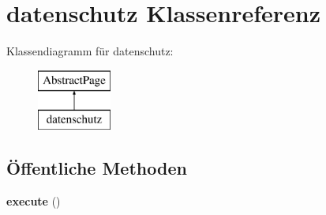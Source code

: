 \hypertarget{classdatenschutz}{}\section{datenschutz Klassenreferenz}
\label{classdatenschutz}
Klassendiagramm für datenschutz\+:\begin{figure}[H]
\begin{center}
\leavevmode
\includegraphics[height=2.000000cm]{classdatenschutz}
\end{center}
\end{figure}
\subsection*{Öffentliche Methoden}
\begin{DoxyCompactItemize}
\item 
\mbox{\label{classdatenschutz_a17fded1d96318b460943ce1d5e4f5c8a}} 
{\bfseries execute} ()
\end{DoxyCompactItemize}
